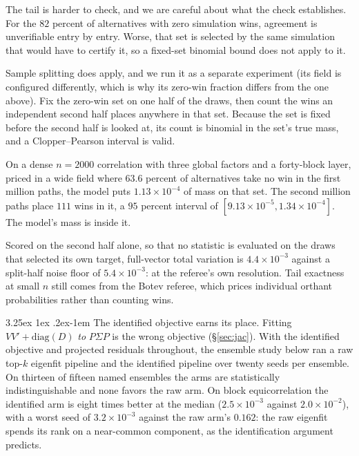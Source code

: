 \documentclass[11pt]{article}
\makeatletter
\renewcommand\paragraph{\@startsection{paragraph}{4}{\z@}%
  {3.25ex \@plus1ex \@minus.2ex}{-1em}%
  {\normalfont\normalsize\itshape}}
\makeatother
\begin{document}
The tail is harder to check, and we are careful about what the check
establishes. For the $82$ percent of alternatives with zero simulation
wins, agreement is unverifiable entry by entry. Worse, that set is
selected by the same simulation that would have to certify it, so a
fixed-set binomial bound does not apply to it.

Sample splitting does apply, and we run it as a separate experiment
(its field is configured differently, which is why its zero-win fraction
differs from the one above). Fix the zero-win set on one
half of the draws, then count the wins an independent second half places
anywhere in that set. Because the set is fixed before the second half is
looked at, its count is binomial in the set's true mass, and a
Clopper--Pearson interval is valid.

On a dense $n=2000$ correlation with three global factors and a
forty-block layer, priced in a wide field where $63.6$ percent of
alternatives take no win in the first million paths, the model puts
$1.13\times10^{-4}$ of mass on that set. The second million paths place
$111$ wins in it, a $95$ percent interval of
$[9.13\times10^{-5},1.34\times10^{-4}]$. The model's mass is inside it.

Scored on the second half alone, so that no statistic is evaluated on the
draws that selected its own target, full-vector total variation is
$4.4\times10^{-3}$ against a split-half noise floor of $5.4\times10^{-3}$:
at the referee's own resolution. Tail exactness at small $n$ still comes
from the Botev referee, which prices individual orthant probabilities
rather than counting wins.

\paragraph{The identified objective earns its place.} Fitting
$VV'+\mathrm{diag}(D)$ \emph{to} $P\Sigma P$ is the wrong
objective (\S\ref{sec:jac}). With the identified objective and projected residuals throughout, the ensemble
study below ran a raw top-$k$ eigenfit pipeline and the identified
pipeline over twenty seeds per ensemble. On thirteen of fifteen named
ensembles the arms are statistically indistinguishable and none favors
the raw arm. On block equicorrelation the identified arm is eight
times better at the median ($2.5\times10^{-3}$ against
$2.0\times10^{-2}$), with a worst seed of $3.2\times10^{-3}$ against
the raw arm's $0.162$: the raw eigenfit spends its rank on a
near-common component, as the identification argument predicts.
\end{document}
